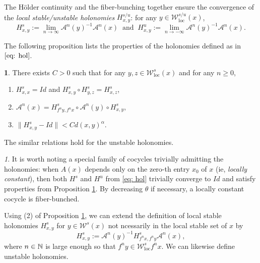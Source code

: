\documentclass[11pt,oneside,reqno]{amsart}
\numberwithin{equation}{section}
\numberwithin{figure}{section}
\theoremstyle{definition}
\theoremstyle{definition}
\theoremstyle{definition}
\theoremstyle{definition}
\theoremstyle{remark}
\newtheorem{rem}[thm]{\protect\remarkname}
\theoremstyle{definition}
\theoremstyle{definition}
\theoremstyle{definition}
\newtheorem{prop}[thm]{\protect\propositionname}
\def\A{\mathcal{A}}
\def\W{\mathcal{W}}
\def\hol{H\"older }
\newcommand{\Wloc}{\mathcal{W}_{\text{loc}}}
\providecommand{\propositionname}{Proposition}
\providecommand{\remarkname}{Remark}
\begin{document}
The \hol continuity and the fiber-bunching together ensure the convergence of the \textit{local stable/unstable holonomies} $H^{s/u}_{x,y}$: for any $y \in \Wloc^{s/u}(x)$, 
\begin{equation}\label{eq: hol}
H^s_{x,y} :=\lim\limits_{n \to \infty} \A^n(y)^{-1}\A^n(x) ~\text{ and }~H^u_{x,y}:= \lim\limits_{n \to -\infty} \A^n(y)^{-1}\A^n(x).
\end{equation}

The following proposition lists the properties of the holonomies defined as in $\eqref{eq: hol}$.
\begin{prop}\label{prop:  hol rel} There exists $C>0$ such that for any $y,z \in \Wloc^s(x)$ and for any $n \geq 0$, 
\begin{enumerate}
\item $H^s_{x,x} = Id$ and $H^s_{x,y}\circ H^s_{y,z} = H^s_{x,z}$,
\item $\A^n(x) = H^s_{f^ny,f^nx} \circ \A^n(y) \circ H^s_{x,y}$,
\item $\|H^{s}_{x,y} - Id\| < Cd(x,y)^{\alpha}$.
\end{enumerate}
The similar relations hold for the unstable holonomies.
\end{prop}

\begin{rem}
It is worth noting a special family of cocycles trivially admitting the holonomies: when $A(x)$ depends only on the zero-th entry $x_0$ of $x$ (ie, \textit{locally constant}), then both $H^s$ and $H^u$ from \eqref{eq: hol} trivially converge to $Id$ and satisfy properties from Proposition \ref{prop:  hol rel}. By decreasing $\theta$ if necessary, a locally constant cocycle is fiber-bunched.
\end{rem}

Using (2) of Proposition \ref{prop:  hol rel}, we can extend the definition of local stable holonomies $H^s_{x,y}$ for $y \in \W^s(x)$ not ncessarily in the local stable set of $x$ by
$$H^s_{x,y}:= \A^n(y)^{-1} H^s_{f^nx,f^ny}\A^n(x),$$
where $n \in \mathbb{N}$ is large enough so that $f^ny \in \Wloc^s{f^nx}$. We can likewise define unstable holonomies.  
\end{document}
